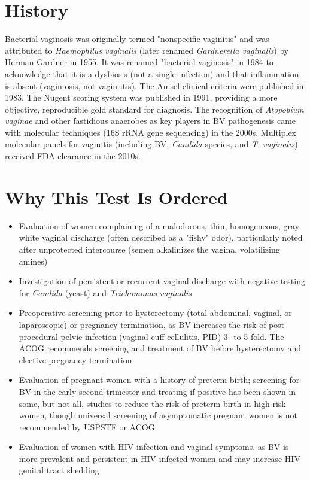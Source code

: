 \section*{History}
Bacterial vaginosis was originally termed "nonspecific vaginitis" and was attributed to \textit{Haemophilus vaginalis} (later renamed \textit{Gardnerella vaginalis}) by Herman Gardner in 1955. It was renamed "bacterial vaginosis" in 1984 to acknowledge that it is a dysbiosis (not a single infection) and that inflammation is absent (vagin-osis, not vagin-itis). The Amsel clinical criteria were published in 1983. The Nugent scoring system was published in 1991, providing a more objective, reproducible gold standard for diagnosis. The recognition of \textit{Atopobium vaginae} and other fastidious anaerobes as key players in BV pathogenesis came with molecular techniques (16S rRNA gene sequencing) in the 2000s. Multiplex molecular panels for vaginitis (including BV, \textit{Candida} species, and \textit{T. vaginalis}) received FDA clearance in the 2010s.

\section*{Why This Test Is Ordered}
\begin{itemize}
  \item Evaluation of women complaining of a malodorous, thin, homogeneous, gray-white vaginal discharge (often described as a "fishy" odor), particularly noted after unprotected intercourse (semen alkalinizes the vagina, volatilizing amines)
  \item Investigation of persistent or recurrent vaginal discharge with negative testing for \textit{Candida} (yeast) and \textit{Trichomonas vaginalis}
  \item Preoperative screening prior to hysterectomy (total abdominal, vaginal, or laparoscopic) or pregnancy termination, as BV increases the risk of post-procedural pelvic infection (vaginal cuff cellulitis, PID) 3- to 5-fold. The ACOG recommends screening and treatment of BV before hysterectomy and elective pregnancy termination
  \item Evaluation of pregnant women with a history of preterm birth; screening for BV in the early second trimester and treating if positive has been shown in some, but not all, studies to reduce the risk of preterm birth in high-risk women, though universal screening of asymptomatic pregnant women is not recommended by USPSTF or ACOG
  \item Evaluation of women with HIV infection and vaginal symptoms, as BV is more prevalent and persistent in HIV-infected women and may increase HIV genital tract shedding
\end{itemize}

